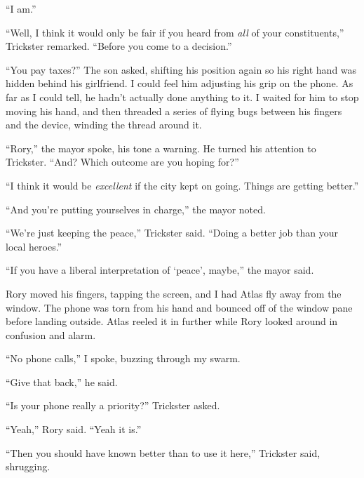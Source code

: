 ``I am.''



``Well, I think it would only be fair if you heard from \emph{all} of your constituents,'' Trickster remarked.  ``Before you come to a decision.''



``You pay taxes?'' The son asked, shifting his position again so his right hand was hidden behind his girlfriend.  I could feel him adjusting his grip on the phone.  As far as I could tell, he hadn't actually done anything to it.  I waited for him to stop moving his hand, and then threaded a series of flying bugs between his fingers and the device, winding the thread around it.



``Rory,'' the mayor spoke, his tone a warning.  He turned his attention to Trickster.  ``And?  Which outcome are you hoping for?''



``I think it would be \emph{excellent} if the city kept on going.  Things are getting better.''



``And you're putting yourselves in charge,'' the mayor noted.



``We're just keeping the peace,'' Trickster said.  ``Doing a better job than your local heroes.''



``If you have a liberal interpretation of `peace', maybe,'' the mayor said.



Rory moved his fingers, tapping the screen, and I had Atlas fly away from the window.  The phone was torn from his hand and bounced off of the window pane before landing outside.  Atlas reeled it in further while Rory looked around in confusion and alarm.



``No phone calls,'' I spoke, buzzing through my swarm.



``Give that back,'' he said.



``Is your phone really a priority?'' Trickster asked.



``Yeah,'' Rory said.  ``Yeah it is.''



``Then you should have known better than to use it here,'' Trickster said, shrugging.



